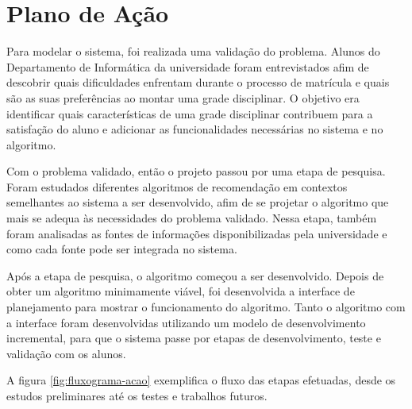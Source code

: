 
\chapter{Plano de Ação}
\label{cha:Plano de Ação}

Para modelar o sistema, foi realizada uma validação do problema. Alunos do Departamento de Informática da universidade foram entrevistados afim de descobrir quais dificuldades enfrentam durante o processo de matrícula e quais são as suas preferências ao montar uma grade disciplinar. O objetivo era identificar quais características de uma grade disciplinar contribuem para a satisfação do aluno e adicionar as funcionalidades necessárias no sistema e no algoritmo.

Com o problema validado, então o projeto passou por uma etapa de pesquisa. 
Foram estudados diferentes algoritmos de recomendação em contextos semelhantes ao sistema a ser desenvolvido, afim de se projetar o algoritmo que mais se adequa às necessidades do problema validado. 
Nessa etapa, também foram analisadas as fontes de informações disponibilizadas pela universidade e como cada fonte pode ser integrada no sistema. 

Após a etapa de pesquisa, o algoritmo começou a ser desenvolvido. 
Depois de obter um algoritmo minimamente viável, foi desenvolvida a interface de planejamento para mostrar o funcionamento do algoritmo. 
Tanto o algoritmo com a interface foram desenvolvidas utilizando um modelo de desenvolvimento incremental, para que o sistema passe por etapas de desenvolvimento, teste e validação com os alunos. 

A figura \ref{fig:fluxograma-acao} exemplifica o fluxo das etapas efetuadas, desde os estudos preliminares até os testes e trabalhos futuros.

